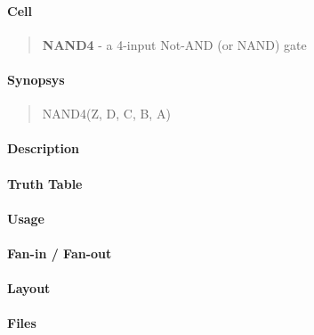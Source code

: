 \label{NAND4}
\paragraph{Cell}
\begin{quote}
    \textbf{NAND4} - a 4-input Not-AND (or NAND) gate
\end{quote}

\paragraph{Synopsys}
\begin{quote}
    NAND4(Z, D, C, B, A)
\end{quote}

\paragraph{Description}

%

\paragraph{Truth Table}
%

\paragraph{Usage}

\paragraph{Fan-in / Fan-out}

\paragraph{Layout}

\paragraph{Files}

